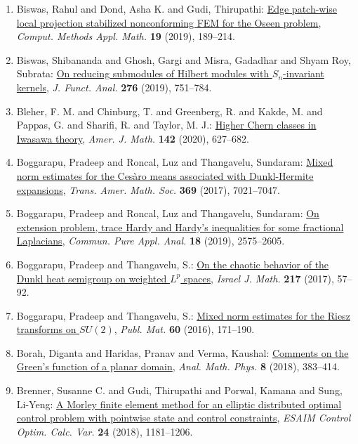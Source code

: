 \begin{enumerate}
\item Biswas, Rahul and Dond, Asha K. and Gudi, Thirupathi: \href{https://doi.org/10.1515/cmam-2018-0020}{Edge patch-wise local projection stabilized nonconforming
{FEM} for the {O}seen problem}, \emph{Comput. Methods Appl. Math.} {\bf 19} (2019), 189--214.
\item Biswas, Shibananda and Ghosh, Gargi and Misra, Gadadhar and
Shyam Roy, Subrata: \href{https://doi.org/10.1016/j.jfa.2018.10.025}{On reducing submodules of {H}ilbert modules with
{${S}_n$}-invariant kernels}, \emph{J. Funct. Anal.} {\bf 276} (2019), 751--784.
\item Bleher, F. M. and Chinburg, T. and Greenberg, R. and Kakde, M.
and Pappas, G. and Sharifi, R. and Taylor, M. J.: \href{https://doi.org/10.1353/ajm.2020.0017}{Higher {C}hern classes in {I}wasawa theory}, \emph{Amer. J. Math.} {\bf 142} (2020), 627--682.
\item Boggarapu, Pradeep and Roncal, Luz and Thangavelu, Sundaram: \href{https://doi.org/10.1090/tran/6861}{Mixed norm estimates for the {C}es\`aro means associated with
{D}unkl-{H}ermite expansions}, \emph{Trans. Amer. Math. Soc.} {\bf 369} (2017), 7021--7047.
\item Boggarapu, Pradeep and Roncal, Luz and Thangavelu, Sundaram: \href{https://doi.org/10.3934/cpaa.2019116}{On extension problem, trace {H}ardy and {H}ardy's inequalities
for some fractional {L}aplacians}, \emph{Commun. Pure Appl. Anal.} {\bf 18} (2019), 2575--2605.
\item Boggarapu, Pradeep and Thangavelu, S.: \href{https://doi.org/10.1007/s11856-017-1438-6}{On the chaotic behavior of the {D}unkl heat semigroup on
weighted {$L^p$} spaces}, \emph{Israel J. Math.} {\bf 217} (2017), 57--92.
\item Boggarapu, Pradeep and Thangavelu, S.: \href{http://projecteuclid.org/euclid.pm/1450818486}{Mixed norm estimates for the {R}iesz transforms on {$SU(2)$}}, \emph{Publ. Mat.} {\bf 60} (2016), 171--190.
\item Borah, Diganta and Haridas, Pranav and Verma, Kaushal: \href{https://doi.org/10.1007/s13324-017-0177-5}{Comments on the {G}reen's function of a planar domain}, \emph{Anal. Math. Phys.} {\bf 8} (2018), 383--414.
\item Brenner, Susanne C. and Gudi, Thirupathi and Porwal, Kamana
and Sung, Li-Yeng: \href{https://doi.org/10.1051/cocv/2017031}{A {M}orley finite element method for an elliptic distributed
optimal control problem with pointwise state and control
constraints}, \emph{ESAIM Control Optim. Calc. Var.} {\bf 24} (2018), 1181--1206.

\end{enumerate}
